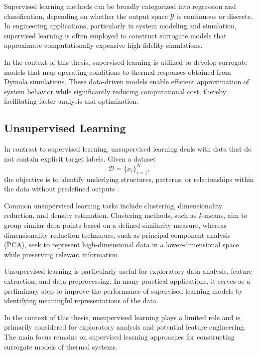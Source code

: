 Supervised learning methods can be broadly categorized into regression and classification, depending on whether the output space $\mathcal{Y}$ is continuous or discrete. In engineering applications, particularly in system modeling and simulation, supervised learning is often employed to construct surrogate models that approximate computationally expensive high-fidelity simulations.

In the context of this thesis, supervised learning is utilized to develop surrogate models that map operating conditions to thermal responses obtained from Dymola simulations. These data-driven models enable efficient approximation of system behavior while significantly reducing computational cost, thereby facilitating faster analysis and optimization.

\subsection{Unsupervised Learning}
\label{sec:unsupervised_learning}

In contrast to supervised learning, unsupervised learning deals with data that do not contain explicit target labels. Given a dataset
\begin{equation}
\mathcal{D} = \{x_i\}_{i=1}^{N},
\end{equation}
the objective is to identify underlying structures, patterns, or relationships within the data without predefined outputs \cite{bishop2006pattern, hastie2009elements}.

Common unsupervised learning tasks include clustering, dimensionality reduction, and density estimation. Clustering methods, such as \textit{k}-means, aim to group similar data points based on a defined similarity measure, whereas dimensionality reduction techniques, such as principal component analysis (PCA), seek to represent high-dimensional data in a lower-dimensional space while preserving relevant information.

Unsupervised learning is particularly useful for exploratory data analysis, feature extraction, and data preprocessing. In many practical applications, it serves as a preliminary step to improve the performance of supervised learning models by identifying meaningful representations of the data.

In the context of this thesis, unsupervised learning plays a limited role and is primarily considered for exploratory analysis and potential feature engineering. The main focus remains on supervised learning approaches for constructing surrogate models of thermal systems.

